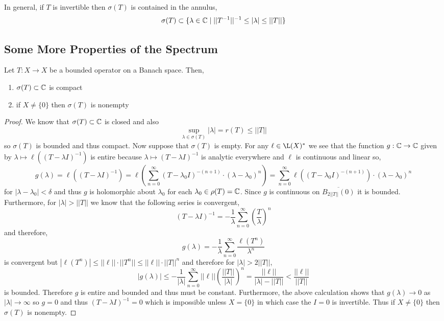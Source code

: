 \documentclass[12pt]{article}
\begin{document}
\begin{rmk}
In general, if $T$ is invertible then $\sigma(T)$ is contained in the annulus,
\[ \sigma(T) \subset \{ \lambda \in \mathbb{C} \mid || T^{-1} ||^{-1} \le |\lambda| \le || T || \} \]
\end{rmk}

\subsection{Some More Properties of the Spectrum}

\begin{prop}
Let $T : X \to X$ be a bounded operator on a Banach space. Then,
\begin{enumerate}
\item $\sigma(T) \subset \mathbb{C}$ is compact
\item if $X \neq \{ 0 \}$ then $\sigma(T)$ is nonempty
\end{enumerate}
\end{prop}

\begin{proof}
We know that $\sigma(T) \subset \mathbb{C}$ is closed and also
\[ \sup_{\lambda \in \sigma(T)} |\lambda| = r(T) \le || T || \]
so $\sigma(T)$ is bounded and thus compact. Now suppose that $\sigma(T)$ is empty. For any $\ell \in \L(X)^*$ we see that the function $g : \mathbb{C} \to \mathbb{C}$ given by $\lambda \mapsto \ell((T - \lambda I)^{-1})$ is entire because $\lambda \mapsto (T - \lambda I)^{-1}$ is analytic everywhere and $\ell$ is continuous and linear so,
\[ g(\lambda) = \ell( (T - \lambda I)^{-1} ) = \ell \left( \sum_{n = 0}^\infty (T - \lambda_0 I)^{-(n+1)} \cdot (\lambda - \lambda_0)^n \right) = \sum_{n = 0}^\infty \ell((T - \lambda_0 I)^{-(n+1)}) \cdot (\lambda - \lambda_0)^n \]
for $| \lambda - \lambda_0 | < \delta$ and thus $g$ is holomorphic about $\lambda_0$ for each $\lambda_0 \in \rho(T) = \mathbb{C}$. Since $g$ is continuous on $\overline{B_{2 || T ||}(0)}$ it is bounded. Furthermore, for $|\lambda| > || T ||$ we know that the following series is convergent,
\[ (T - \lambda I)^{-1} = - \frac{1}{\lambda} \sum_{n = 0}^\infty \left( \frac{T}{\lambda} \right)^n \] 
and therefore,
\[ g(\lambda) = - \frac{1}{\lambda} \sum_{n = 0}^\infty \frac{\ell(T^n)}{\lambda^n} \]
is convergent but $|\ell(T^n)| \le || \ell || \cdot || T^n || \le || \ell || \cdot || T ||^n$ and therefore for $|\lambda| > 2 || T ||$, 
\[ |g(\lambda)| \le - \frac{1}{|\lambda|} \sum_{n = 0}^\infty || \ell || \left( \frac{|| T ||}{|\lambda|} \right)^n = \frac{|| \ell ||}{|\lambda| - || T ||} < \frac{|| \ell ||}{|| T ||} \]
is bounded. Therefore $g$ is entire and bounded and thus must be constant. Furthermore, the above calculation shows that $g(\lambda) \to 0$ as $| \lambda| \to \infty$ so $g = 0$ and thus $(T - \lambda I)^{-1} = 0$ which is impossible unless $X = \{ 0 \}$ in which case the $I = 0$ is invertible. Thus if $X \neq \{ 0 \}$ then $\sigma(T)$ is nonempty.
\end{proof}
\end{document}
